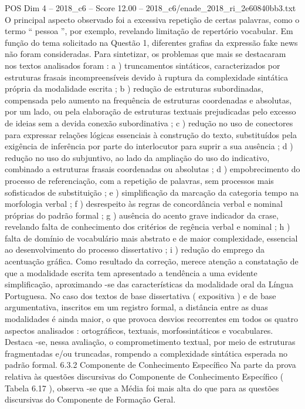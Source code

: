 \begin{textsample}{POS Dim 4 – 2018\_c6 – Score 12.00 – 2018\_c6/enade\_2018\_ri\_2e60840bb3.txt}
O principal aspecto observado foi a excessiva repetição de certas palavras, como o termo “ pessoa ”, por exemplo, revelando limitação de repertório vocabular.
Em função do tema solicitado na Questão 1, diferentes grafias da expressão fake news não foram consideradas.
Para sintetizar, os problemas que mais se destacaram nos textos analisados foram : a ) truncamentos sintáticos, caracterizados por estruturas frasais incompreensíveis devido à ruptura da complexidade sintática própria da modalidade escrita ; b ) redução de estruturas subordinadas, compensada pelo aumento na frequência de estruturas coordenadas e absolutas, por um lado, ou pela elaboração de estruturas textuais prejudicadas pelo excesso de ideias sem a devida conexão subordinativa ; c ) redução no uso de conectores para expressar relações lógicas essenciais à construção do texto, substituídos pela exigência de inferência por parte do interlocutor para suprir a sua ausência ; d ) redução no uso do subjuntivo, ao lado da ampliação do uso do indicativo, combinado a estruturas frasais coordenadas ou absolutas ; d ) empobrecimento do processo de referenciação, com a repetição de palavras, sem processos mais sofisticados de substituição ; e ) simplificação da marcação da categoria tempo na morfologia verbal ; f ) desrespeito às regras de concordância verbal e nominal próprias do padrão formal ; g ) ausência do acento grave indicador da crase, revelando falta de conhecimento dos critérios de regência verbal e nominal ; h ) falta de domínio de vocabulário mais abstrato e de maior complexidade, essencial ao desenvolvimento do processo dissertativo ; i ) redução do emprego da acentuação gráfica.
Como resultado da correção, merece atenção a constatação de que a modalidade escrita tem apresentado a tendência a uma evidente simplificação, aproximando -se das características da modalidade oral da Língua Portuguesa.
No caso dos textos de base dissertativa ( expositiva ) e de base argumentativa, inscritos em um registro formal, a distância entre as duas modalidades é ainda maior, o que provoca desvios recorrentes em todos os quatro aspectos analisados : ortográficos, textuais, morfossintáticos e vocabulares.
Destaca -se, nessa avaliação, o comprometimento textual, por meio de estruturas fragmentadas e/ou truncadas, rompendo a complexidade sintática esperada no padrão formal. 6.3.2 Componente de Conhecimento Específico Na parte da prova relativa às questões discursivas do Componente de Conhecimento Específico ( Tabela 6.17 ), observa -se que a Média foi mais alta do que para as questões discursivas do Componente de Formação Geral.

\end{textsample}
